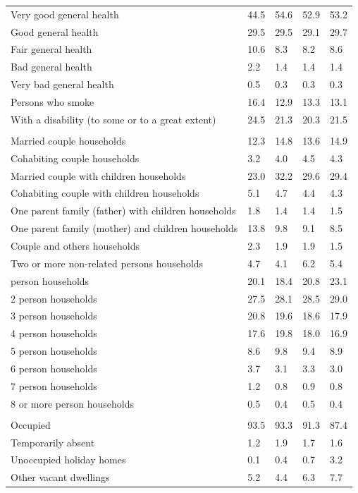 \documentclass{article}
\begin{document}
\begin{table}[h]
\begin{tabular}{KTTTT}
    \hline
Very good general health & 44.5& 54.6&52.9& 53.2\\
Good general health & 29.5& 29.5& 29.1& 29.7\\
Fair general health & 10.6&  8.3& 8.2&  8.6\\
Bad general health & 2.2& 1.4&1.4& 1.4\\
Very bad general health & 0.5& 0.3&0.3& 0.3\\
    \hline
Persons who smoke & 16.4& 12.9&13.3& 13.1\\
    \hline
With a disability (to some or to a great extent) & 24.5& 21.3&20.3& 21.5\\
\hline
    \\ 
    \hline
Married couple households & 12.3& 14.8& 13.6& 14.9\\
Cohabiting couple households & 3.2& 4.0& 4.5& 4.3\\
Married couple with children households & 23.0& 32.2& 29.6& 29.4\\
Cohabiting couple with children households & 5.1& 4.7& 4.4& 4.3\\
One parent family (father) with  children households & 1.8& 1.4& 1.4& 1.5\\
One parent family (mother) and children households & 13.8&  9.8&  9.1&  8.5\\
Couple and others households  & 2.3& 1.9& 1.9& 1.5\\
Two or more non-related persons households & 4.7& 4.1& 6.2& 5.4\\
     person households & 20.1& 18.4& 20.8& 23.1\\
2 person households & 27.5& 28.1& 28.5& 29.0\\
3 person households & 20.8& 19.6& 18.6& 17.9\\
4 person households & 17.6& 19.8& 18.0& 16.9\\
5 person households & 8.6& 9.8& 9.4& 8.9\\
6 person households & 3.7& 3.1& 3.3& 3.0\\
7 person households & 1.2& 0.8& 0.9& 0.8\\
8 or more person households & 0.5& 0.4& 0.5& 0.4\\
\hline
    \\ 
    \hline
Occupied & 93.5& 93.3& 91.3& 87.4\\
Temporarily absent & 1.2& 1.9& 1.7& 1.6\\
Unoccupied holiday homes & 0.1& 0.4& 0.7& 3.2\\
Other vacant dwellings & 5.2& 4.4& 6.3& 7.7\\
\hline
\end{tabular}
\end{table}
\end{document}
